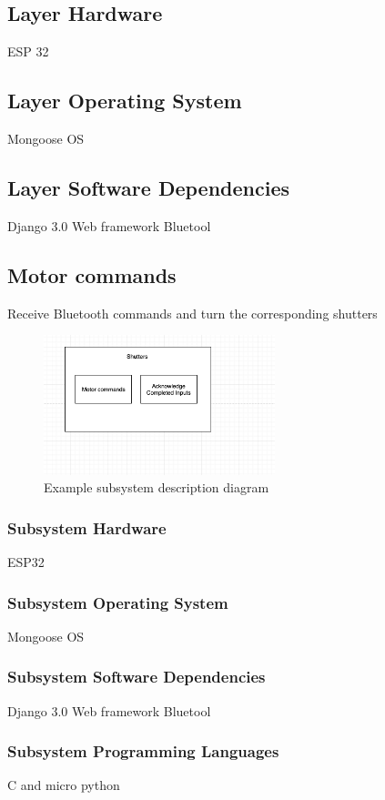 
\subsection{Layer Hardware}
ESP 32

\subsection{Layer Operating System}
Mongoose OS

\subsection{Layer Software Dependencies}
Django 3.0 Web framework
Bluetool


\subsection{Motor commands}
Receive Bluetooth commands and turn the corresponding shutters

\begin{figure}[h!]
	\centering
 	\includegraphics[width=0.60\textwidth]{images/Shutters}
 \caption{Example subsystem description diagram}
\end{figure}

\subsubsection{Subsystem Hardware}
ESP32

\subsubsection{Subsystem Operating System}
Mongoose OS

\subsubsection{Subsystem Software Dependencies}
Django 3.0 Web framework
Bluetool

\subsubsection{Subsystem Programming Languages}
C and micro python

